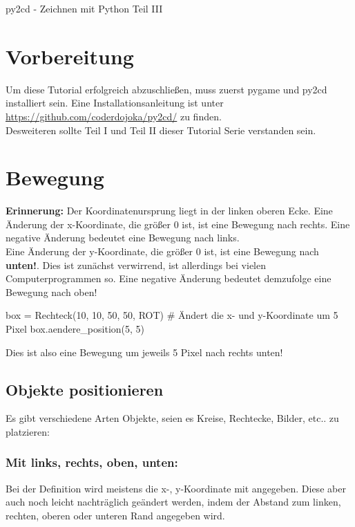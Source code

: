 \documentclass{\VorlagenPfad/coderdojokatext}
\newcommand{\Titel}{py2cd - Zeichnen mit Python Teil III}
\begin{document}
\begin{center}
	{\huge \Titel}
\end{center}

\section{Vorbereitung}
Um diese Tutorial erfolgreich abzuschließen, muss zuerst pygame und py2cd installiert sein. Eine Installationsanleitung ist unter \url{https://github.com/coderdojoka/py2cd/} zu finden.
\\
Desweiteren sollte Teil I und Teil II dieser Tutorial Serie verstanden sein.
\section{Bewegung}

\begin{merkbox}
\textbf{Erinnerung:} Der Koordinatenursprung  liegt in der linken oberen Ecke.
Eine Änderung der x-Koordinate, die größer 0 ist, ist eine Bewegung nach rechts. Eine negative Änderung bedeutet eine Bewegung nach links.	
\\
Eine Änderung der y-Koordinate, die größer 0 ist, ist eine Bewegung nach \textbf{unten!}. Dies ist zunächst verwirrend, ist allerdings bei vielen Computerprogrammen so. Eine negative Änderung bedeutet demzufolge eine Bewegung nach oben!	

\begin{pythoncode}
box = Rechteck(10, 10, 50, 50, ROT)
# Ändert die x- und y-Koordinate um 5 Pixel
box.aendere_position(5, 5)
\end{pythoncode}

Dies ist also eine Bewegung um jeweils 5 Pixel nach rechts unten!
\end{merkbox}

\subsection{Objekte positionieren}
Es gibt verschiedene Arten Objekte, seien es Kreise, Rechtecke, Bilder, etc.. zu platzieren:

\subsubsection{Mit links, rechts, oben, unten:}
Bei der Definition wird meistens die x-, y-Koordinate mit angegeben. Diese aber auch noch leicht nachträglich geändert werden, indem der Abstand zum linken, rechten, oberen oder unteren Rand angegeben wird.
\end{document}

